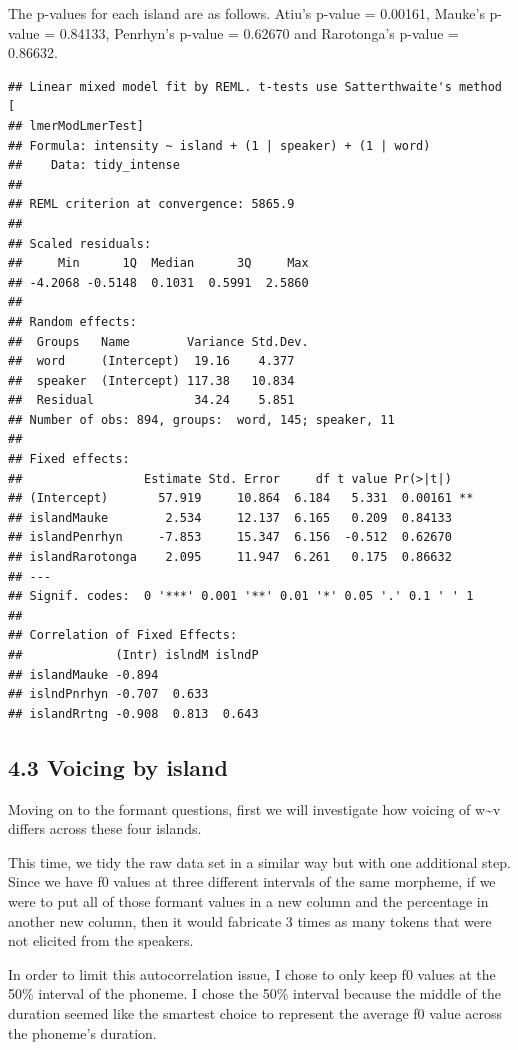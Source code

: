 \documentclass[
  ,man,floatsintext]{apa6}
\begin{document}
The p-values for each island are as follows. Atiu's p-value = 0.00161, Mauke's p-value = 0.84133, Penrhyn's p-value = 0.62670 and Rarotonga's p-value = 0.86632.

\begin{verbatim}
## Linear mixed model fit by REML. t-tests use Satterthwaite's method [
## lmerModLmerTest]
## Formula: intensity ~ island + (1 | speaker) + (1 | word)
##    Data: tidy_intense
## 
## REML criterion at convergence: 5865.9
## 
## Scaled residuals: 
##     Min      1Q  Median      3Q     Max 
## -4.2068 -0.5148  0.1031  0.5991  2.5860 
## 
## Random effects:
##  Groups   Name        Variance Std.Dev.
##  word     (Intercept)  19.16    4.377  
##  speaker  (Intercept) 117.38   10.834  
##  Residual              34.24    5.851  
## Number of obs: 894, groups:  word, 145; speaker, 11
## 
## Fixed effects:
##                 Estimate Std. Error     df t value Pr(>|t|)   
## (Intercept)       57.919     10.864  6.184   5.331  0.00161 **
## islandMauke        2.534     12.137  6.165   0.209  0.84133   
## islandPenrhyn     -7.853     15.347  6.156  -0.512  0.62670   
## islandRarotonga    2.095     11.947  6.261   0.175  0.86632   
## ---
## Signif. codes:  0 '***' 0.001 '**' 0.01 '*' 0.05 '.' 0.1 ' ' 1
## 
## Correlation of Fixed Effects:
##             (Intr) islndM islndP
## islandMauke -0.894              
## islndPnrhyn -0.707  0.633       
## islandRrtng -0.908  0.813  0.643
\end{verbatim}

\subsection{4.3 Voicing by island}\label{voicing-by-island}

Moving on to the formant questions, first we will investigate how voicing of w\textasciitilde v differs across these four islands.

This time, we tidy the raw data set in a similar way but with one additional step. Since we have f0 values at three different intervals of the same morpheme, if we were to put all of those formant values in a new column and the percentage in another new column, then it would fabricate 3 times as many tokens that were not elicited from the speakers.

In order to limit this autocorrelation issue, I chose to only keep f0 values at the 50\% interval of the phoneme. I chose the 50\% interval because the middle of the duration seemed like the smartest choice to represent the average f0 value across the phoneme's duration.
\end{document}
